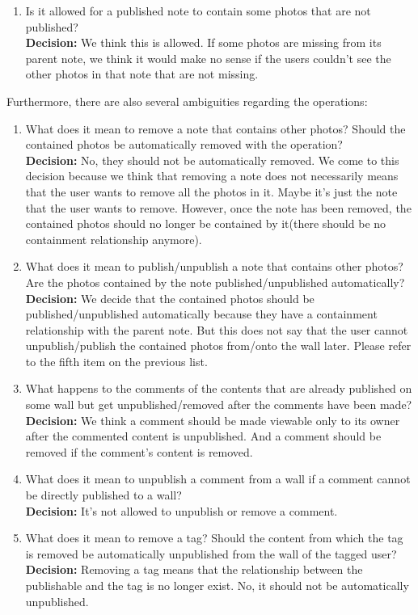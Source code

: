 \documentclass[titlepage]{article}
\begin{document}
\begin{enumerate}
    \item Is it allowed for a published note to contain some photos that are not published?\\
    \textbf{Decision:} We think this is allowed. If some photos are missing from its parent note, we think it would make no sense if the users couldn't see the other photos in that note that are not missing.
    
\end{enumerate}

Furthermore, there are also several ambiguities regarding the operations:

\begin{enumerate}
    \item What does it mean to remove a note that contains other photos? Should the contained photos be automatically removed with the operation?\\
    \textbf{Decision:} No, they should not be automatically removed. We come to this decision because we think that removing a note does not necessarily means that the user wants to remove all the photos in it. Maybe it's just the note that the user wants to remove. However, once the note has been removed, the contained photos should no longer be contained by it(there should be no containment relationship anymore).

    \item What does it mean to publish/unpublish a note that contains other photos? Are the photos contained by the note published/unpublished automatically? \\
    \textbf{Decision:} We decide that the contained photos should be published/unpublished automatically because they have a containment relationship with the parent note. But this does not say that the user cannot unpublish/publish the contained photos from/onto the wall later. Please refer to the fifth item on the previous list.
    
    \item What happens to the comments of the contents that are already published on some wall but get unpublished/removed after the comments have been made?\\
    \textbf{Decision:} We think a comment should be made viewable only to its owner after the commented content is unpublished. And a comment should be removed if the comment's content is removed.
    
    \item What does it mean to unpublish a comment from a wall if a comment cannot be directly published to a wall?\\
    \textbf{Decision:} It's not allowed to unpublish or remove a comment.
    
    \item What does it mean to remove a tag? Should the content from which the tag is removed be automatically unpublished from the wall of the tagged user?\\
    \textbf{Decision:} Removing a tag means that the relationship between the publishable and the tag is no longer exist. No, it should not be automatically unpublished.
\end{enumerate}
\end{document}
